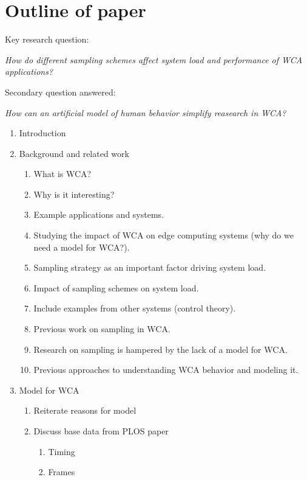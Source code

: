 \section{Outline of paper}

Key research question: 

\emph{How do different sampling schemes affect system load and performance of WCA applications?}

Secondary question answered:

\emph{How can an artificial model of human behavior simplify reasearch in WCA?}

\begin{enumerate}
    \item Introduction
    \item Background and related work
        \begin{enumerate}
            \item What is WCA?
            \item Why is it interesting?
            \item Example applications and systems.
            \item Studying the impact of WCA on edge computing systems (why do we need a model for WCA?).
            \item Sampling strategy as an important factor driving system load.
            \item Impact of sampling schemes on system load.
            \item Include examples from other systems (control theory).
            \item Previous work on sampling in WCA.
            \item Research on sampling is hampered by the lack of a model for WCA.
            \item Previous approaches to understanding WCA behavior and modeling it.
        \end{enumerate}
    \item Model for WCA
        \begin{enumerate}
            \item Reiterate reasons for model
            \item Discuss base data from PLOS paper
                \begin{enumerate}
                    \item Timing
                    \item Frames
                \end{enumerate}

\end{enumerate}
\end{enumerate}
